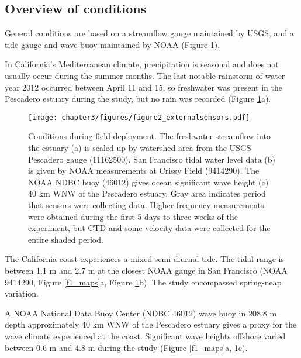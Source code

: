\subsection{Overview of conditions\label{sub:ext_cond}}

General conditions are based on a streamflow gauge maintained by USGS,
and a tide gauge and wave buoy maintained by NOAA (Figure \ref{f2_QTHs}). 

In California's Mediterranean climate, precipitation is seasonal and
does not usually occur during the summer months. The last notable
rainstorm of water year 2012 occurred between April 11 and 15, so
freshwater was present in the Pescadero estuary during the study,
but no rain was recorded (Figure \ref{f2_QTHs}a). 


\begin{figure}[tp]
\texttt{[image: chapter3/figures/figure2\_externalsensors.pdf]}

\protect\caption{Conditions during field deployment. The freshwater streamflow into
the estuary (a) is scaled up by watershed area from the USGS Pescadero
gauge (11162500). San Francisco tidal water level data (b) is given
by NOAA measurements at Crissy Field (9414290). The NOAA NDBC buoy
(46012) gives ocean significant wave height (c) 40 km WNW of the Pescadero
estuary. Gray area indicates period that sensors were collecting data.
Higher frequency measurements were obtained during the first 5 days
to three weeks of the experiment, but CTD and some velocity data were
collected for the entire shaded period. \label{f2_QTHs}}
\end{figure}

The California coast experiences a mixed semi-diurnal tide. The tidal
range is between 1.1 m and 2.7 m at the closest NOAA gauge in San
Francisco (NOAA 9414290, Figure \ref{f1_maps}a, Figure \ref{f2_QTHs}b).
The study encompassed spring-neap variation.

A NOAA National Data Buoy Center (NDBC 46012) wave buoy in
208.8 m depth approximately 40 km WNW of the Pescadero estuary gives
a proxy for the wave climate experienced at the coast. Significant
wave heights offshore varied between 0.6 m and 4.8 m during the study
(Figure \ref{f1_maps}a, \ref{f2_QTHs}c). 





